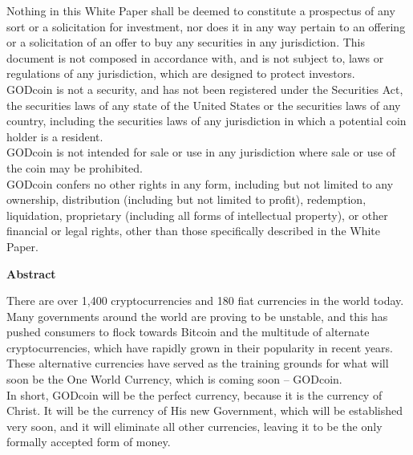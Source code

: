 \documentclass[12pt,a4paper]{article}
\begin{document}
  Nothing in this White Paper shall be deemed to constitute a prospectus of any sort or a solicitation for investment, nor does it in any way pertain to an offering or a solicitation of an offer to buy any securities in any jurisdiction. This document is not composed in accordance with, and is not subject to, laws or regulations of any jurisdiction, which are designed to protect investors.\\

  GODcoin is not a security, and has not been registered under the Securities Act, the securities laws of any state of the United States or the securities laws of any country, including the securities laws of any jurisdiction in which a potential coin holder is a resident.\\

  GODcoin is not intended for sale or use in any jurisdiction where sale or use of the coin may be prohibited.\\

  GODcoin confers no other rights in any form, including but not limited to any ownership, distribution (including but not limited to profit), redemption, liquidation, proprietary (including all forms of intellectual property), or other financial or legal rights, other than those specifically described in the White Paper.

  \newpage
  \begin{center}
    \Large{\textbf{Abstract}}
  \end{center}
  \setlength{\parindent}{0pt}
  \vspace{3mm}
  \vspace{3mm}

  There are over 1,400 cryptocurrencies and 180 fiat currencies in
  the world today. Many governments around the world are proving to be
  unstable, and this has pushed consumers to flock towards Bitcoin and the
  multitude of alternate cryptocurrencies, which have rapidly grown in their
  popularity in recent years. These alternative currencies have served as the
  training grounds for what will soon be the One World Currency, which is
  coming soon – GODcoin.\\

  In short, GODcoin will be the perfect currency, because it is the currency
  of Christ. It will be the currency of His new Government, which will be
  established very soon, and it will eliminate all other currencies, leaving
  it to be the only formally accepted form of money.\\
\end{document}
